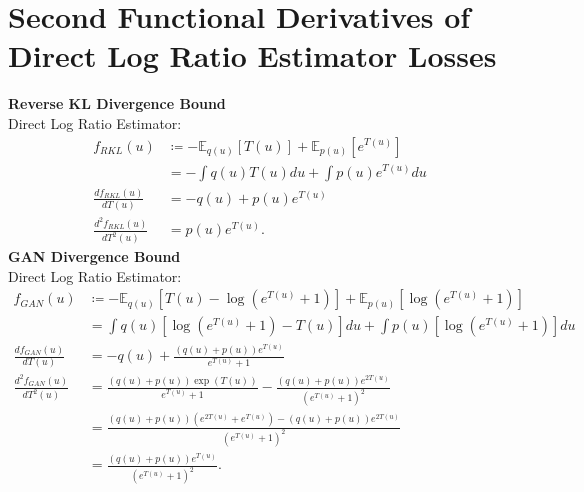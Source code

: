 \documentclass[honours,12pt]{unswthesis}
\newcommand{\E}{\mathbb{E}}
\numberwithin{equation}{section}
\theoremstyle{definition}
\begin{document}
\chapter{Second Functional Derivatives of Direct Log Ratio Estimator Losses}\label{app:F}
\textbf{Reverse KL Divergence Bound}\\
Direct Log Ratio Estimator:
\begin{align*}
f_{RKL}(u)&\coloneqq-\E_{q(u)}[T(u)]+\E_{p(u)}[e^{T(u)}]\\
&=-\int q(u)T(u)du+\int p(u)e^{T(u)}du\\
\frac{df_{RKL}(u)}{dT(u)}&=-q(u)+p(u)e^{T(u)}\\
\frac{d^2f_{RKL}(u)}{dT^2(u)}&=p(u)e^{T(u)}.
\end{align*}
\textbf{GAN Divergence Bound}\\
Direct Log Ratio Estimator:
\begin{align*}
f_{GAN}(u)&\coloneqq-\E_{q(u)}[T(u)-\log(e^{T(u)}+1)]+\E_{p(u)}[\log(e^{T(u)}+1)]\\
&=\int q(u)[\log(e^{T(u)}+1)-T(u)] du+\int p(u)[\log(e^{T(u)}+1)]du\\
\frac{df_{GAN}(u)}{dT(u)}&=-q(u)+\frac{(q(u)+p(u))e^{T(u)}}{e^{T(u)}+1}\\
\frac{d^2f_{GAN}(u)}{dT^2(u)}&=\frac{(q(u)+p(u))\exp(T(u))}{e^{T(u)}+1}-\frac{(q(u)+p(u))e^{2T(u)}}{(e^{T(u)}+1)^2}\\
&=\frac{(q(u)+p(u))(e^{2T(u)}+e^{T(u)})-(q(u)+p(u))e^{2T(u)}}{(e^{T(u)}+1)^2}\\
&=\frac{(q(u)+p(u))e^{T(u)}}{(e^{T(u)}+1)^2}.
\end{align*}
\end{document}
